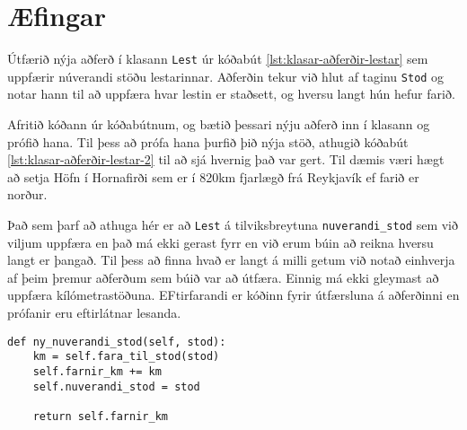 \section{Æfingar}
\begin{exercise}\label{kla1}
Útfærið nýja aðferð í klasann \texttt{Lest} úr kóðabút \ref{lst:klasar-aðferðir-lestar} sem uppfærir núverandi stöðu lestarinnar.
Aðferðin tekur við hlut af taginu \texttt{Stod} og notar hann til að uppfæra hvar lestin er staðsett, og hversu langt hún hefur farið.

Afritið kóðann úr kóðabútnum, og bætið þessari nýju aðferð inn í klasann og prófið hana.
Til þess að prófa hana þurfið þið nýja stöð, athugið kóðabút \ref{lst:klasar-aðferðir-lestar-2} til að sjá hvernig það var gert.
Til dæmis væri hægt að setja Höfn í Hornafirði sem er í 820km fjarlægð frá Reykjavík ef farið er norður.
\end{exercise}
\begin{Answer}[ref={kla1}]
Það sem þarf að athuga hér er að \texttt{Lest} á tilviksbreytuna \texttt{nuverandi\_stod} sem við viljum uppfæra en það má ekki gerast fyrr en við erum búin að reikna hversu langt er þangað.
Til þess að finna hvað er langt á milli getum við notað einhverja af þeim þremur aðferðum sem búið var að útfæra.
Einnig má ekki gleymast að uppfæra kílómetrastöðuna.
EFtirfarandi er kóðinn fyrir útfærsluna á aðferðinni en prófanir eru eftirlátnar lesanda.
	\begin{lstlisting}
def ny_nuverandi_stod(self, stod):
	km = self.fara_til_stod(stod)
	self.farnir_km += km
	self.nuverandi_stod = stod

	return self.farnir_km\end{lstlisting}
\end{Answer}

